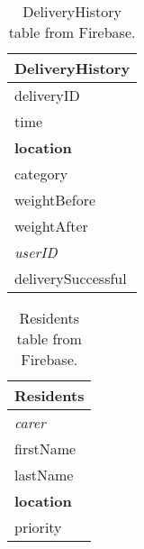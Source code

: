 \documentclass{article}
\begin{document}
\begin{table}[h]
\vskip 3mm
\begin{center}
\begin{small}
\begin{sc}
\begin{tabular}{l}
\hline
\abovespace\belowspace
DeliveryHistory \\
\hline
  deliveryID \\
  time \\
  {\bf location} \\
  category \\
  weightBefore\\
  weightAfter\\
  {\it userID}\\
  deliverySuccessful
\end{tabular}
\end{sc}
\end{small}
\caption{DeliveryHistory table from Firebase.}
\label{tab:delivery-history}
\end{center}
\vskip -3mm
\end{table}

\begin{table}[h]
\vskip 3mm
\begin{center}
\begin{small}
\begin{sc}
\begin{tabular}{l}
\hline
\abovespace\belowspace
Residents \\
\hline
  {\it carer} \\
  firstName \\
  lastName \\
  {\bf location} \\
  priority
\end{tabular}
\end{sc}
\end{small}
\caption{Residents table from Firebase.}
\label{tab:residents}
\end{center}
\vskip -3mm
\end{table}


\end{document}
